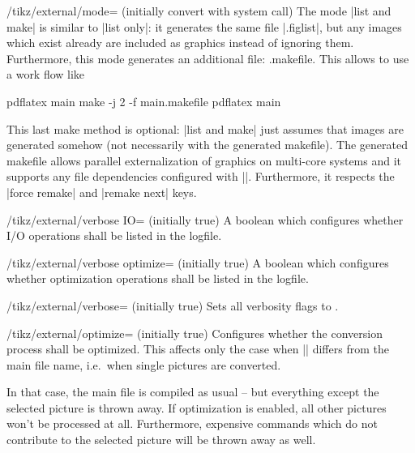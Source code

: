 {\begin{key}{/tikz/external/mode= (initially convert with system call)}
    The mode |list and make| is similar to |list only|: it generates the same
    file |.figlist|, but any images which exist already are
    included as graphics instead of ignoring them. Furthermore, this mode
    generates an additional file: .makefile. This allows to use
    a work flow like
\begin{codeexample}[code only, tikz syntax=false]
pdflatex main
make -j 2 -f main.makefile
pdflatex main
\end{codeexample}
    \noindent This last make method is optional: |list and make| just assumes
    that images are generated somehow (not necessarily with the generated
    makefile). The generated makefile allows parallel externalization of
    graphics on multi-core systems and it supports any file dependencies
    configured with |\tikzpicturedependsonfile|. Furthermore, it respects the
    |force remake| and |remake next| keys.
\end{key}

\begin{key}{/tikz/external/verbose IO= (initially true)}
    A boolean which configures whether I/O operations shall be listed in the
    logfile.
\end{key}

\begin{key}{/tikz/external/verbose optimize= (initially true)}
    A boolean which configures whether optimization operations shall be listed
    in the logfile.
\end{key}

\begin{key}{/tikz/external/verbose= (initially true)}
    Sets all verbosity flags to .
\end{key}

\begin{key}{/tikz/external/optimize= (initially true)}
    Configures whether the conversion process shall be optimized. This affects
    only the case when |\jobname| differs from the main file name, i.e.\ when
    single pictures are converted.

    In that case, the main file is compiled as usual -- but everything except
    the selected picture is thrown away. If optimization is enabled, all other
    pictures won't be processed at all. Furthermore, expensive commands which
    do not contribute to the selected picture will be thrown away as well.


\end{key}}
